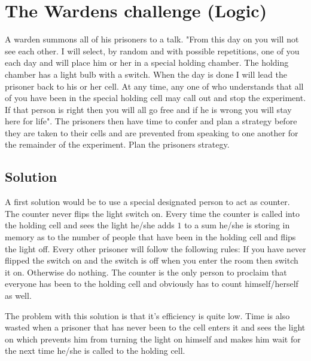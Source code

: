 \section{The Wardens challenge (Logic)}
A warden summons all of his prisoners to a talk. "From this day on you will not see each other. I will select, by random and with possible repetitions, one of you each day and will place him or her in a special holding chamber. The holding chamber has a light bulb with a switch. When the day is done I will lead the prisoner back to his or her cell. At any time, any one of who understands that all of you have been in the special holding cell may call out and stop the experiment. If that person is right then you will all go free and if he is wrong you will stay here for life". The prisoners then have time to confer and plan a strategy before they are taken to their cells and are prevented from speaking to one another for the remainder of the experiment. Plan the prisoners strategy.

\subsection{Solution}
A first solution would be to use a special designated person to act as counter. The counter never flips the light switch on. Every time the counter is called into the holding cell and sees the light he/she adds $1$ to a sum he/she is storing in memory as to the number of people that have been in the holding cell and flips the light off. Every other prisoner will follow the following rules: If you have never flipped the switch on and the switch is off when you enter the room then switch it on. Otherwise do nothing. The counter is the only person to proclaim that everyone has been to the holding cell and obviously has to count himself/herself as well.

The problem with this solution is that it's efficiency is quite low. Time is also wasted when a prisoner that has never been to the cell enters it and sees the light on which prevents him from turning the light on himself and makes him wait for the next time he/she is called to the holding cell.
